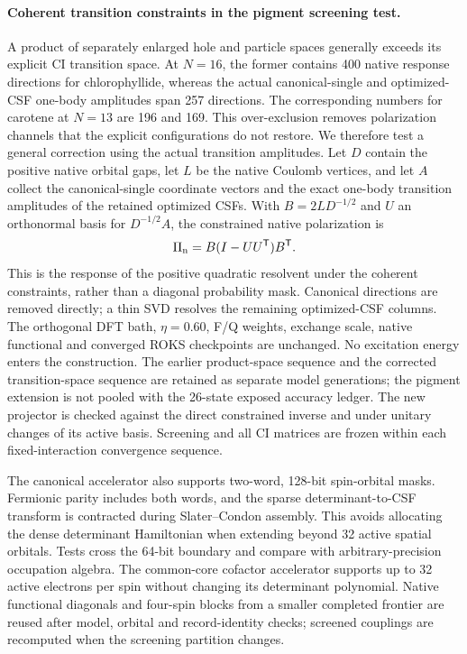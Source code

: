 \documentclass[11pt,a4paper]{article}
\begin{document}
\paragraph{Coherent transition constraints in the pigment screening test.}
A product of separately enlarged hole and particle spaces generally exceeds
its explicit CI transition space. At $N=16$, the former contains 400 native
response directions for chlorophyllide, whereas the actual canonical-single
and optimized-CSF one-body amplitudes span 257 directions. The corresponding
numbers for carotene at $N=13$ are 196 and 169. This over-exclusion removes
polarization channels that the explicit configurations do not restore.
We therefore test a general correction using the actual transition amplitudes.
Let $D$ contain the positive native orbital gaps, let $L$ be the native
Coulomb vertices, and let $A$ collect the canonical-single coordinate vectors
and the exact one-body transition amplitudes of the retained optimized CSFs.
With $B=2LD^{-1/2}$ and $U$ an orthonormal basis for $D^{-1/2}A$, the
constrained native polarization is
\begin{equation}
 \Pi_{\rm n}=B(I-UU^{\mathsf T})B^{\mathsf T}.
\end{equation}
This is the response of the positive quadratic resolvent under the coherent
constraints, rather than a diagonal probability mask. Canonical directions
are removed directly; a thin SVD resolves the remaining optimized-CSF
columns. The orthogonal DFT bath, $\eta=0.60$, F/Q weights, exchange scale,
native functional and converged ROKS checkpoints are unchanged. No excitation
energy enters the construction. The earlier product-space sequence and the
corrected transition-space sequence are retained as separate model generations;
the pigment extension is not pooled with the 26-state exposed accuracy ledger.
The new projector is checked against the direct constrained inverse and under
unitary changes of its active basis. Screening and all CI matrices are frozen
within each fixed-interaction convergence sequence.

The canonical accelerator also supports two-word, 128-bit spin-orbital
masks. Fermionic parity includes both words, and the sparse
determinant-to-CSF transform is contracted during Slater--Condon assembly.
This avoids allocating the dense determinant Hamiltonian when extending
beyond 32 active spatial orbitals. Tests cross the 64-bit boundary and
compare with arbitrary-precision occupation algebra. The common-core
cofactor accelerator supports up to 32 active electrons per spin without
changing its determinant polynomial. Native functional diagonals and
four-spin blocks from a smaller completed frontier are reused after model,
orbital and record-identity checks; screened couplings are recomputed when
the screening partition changes.
\end{document}
